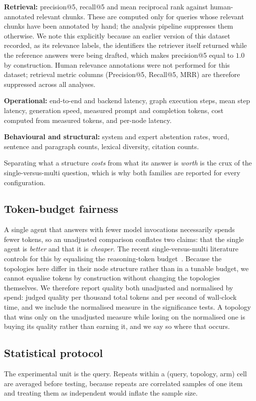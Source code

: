 \documentclass[journal,10pt,compsoc,onecolumn]{IEEEtran}
\begin{document}
\textbf{Retrieval:} precision@5, recall@5 and mean reciprocal rank against
human-annotated relevant chunks. These are computed only for queries whose
relevant chunks have been annotated by hand; the analysis pipeline suppresses them
otherwise. We note this explicitly because an earlier version of this dataset
recorded, as its relevance labels, the identifiers the retriever itself returned
while the reference answers were being drafted, which makes precision@5 equal to
$1.0$ by construction. Human relevance annotations were not performed for this dataset; retrieval metric columns (Precision@5, Recall@5, MRR) are therefore suppressed across all analyses.

\textbf{Operational:} end-to-end and backend latency, graph execution steps, mean
step latency, generation speed, measured prompt and completion tokens, cost
computed from measured tokens, and per-node latency.

\textbf{Behavioural and structural:} system and expert abstention rates, word,
sentence and paragraph counts, lexical diversity, citation counts.

Separating what a structure \emph{costs} from what its answer is \emph{worth} is
the crux of the single-versus-multi question, which is why both families are
reported for every configuration.

\subsection{Token-budget fairness}
A single agent that answers with fewer model invocations necessarily spends fewer
tokens, so an unadjusted comparison conflates two claims: that the single agent is
\emph{better} and that it is \emph{cheaper}. The recent single-versus-multi
literature controls for this by equalising the reasoning-token
budget~\cite{tran2026singleagent}. Because the topologies here differ in their
node structure rather than in a tunable budget, we cannot equalise tokens by
construction without changing the topologies themselves. We therefore report
quality both unadjusted and normalised by spend: judged quality per thousand total
tokens and per second of wall-clock time, and we include the normalised measure in
the significance tests. A topology that wins only on the unadjusted measure while
losing on the normalised one is buying its quality rather than earning it, and we
say so where that occurs.

\subsection{Statistical protocol}
The experimental unit is the query. Repeats within a (query, topology, arm) cell
are averaged before testing, because repeats are correlated samples of one item
and treating them as independent would inflate the sample size.
\end{document}
